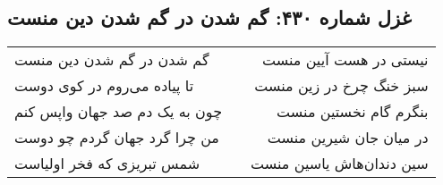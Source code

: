 \begin{center}
\section*{غزل شماره ۴۳۰: گم شدن در گم شدن دین منست}
\label{sec:0430}
\begin{longtable}{l p{0.5cm} r}
گم شدن در گم شدن دین منست
&&
نیستی در هست آیین منست
\\
تا پیاده می‌روم در کوی دوست
&&
سبز خنگ چرخ در زین منست
\\
چون به یک دم صد جهان واپس کنم
&&
بنگرم گام نخستین منست
\\
من چرا گرد جهان گردم چو دوست
&&
در میان جان شیرین منست
\\
شمس تبریزی که فخر اولیاست
&&
سین دندان‌هاش یاسین منست
\\
\end{longtable}
\end{center}
